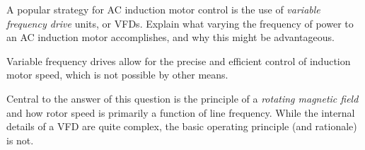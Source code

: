 

A popular strategy for AC induction motor control is the use of {\it variable frequency drive} units, or VFDs.  Explain what varying the frequency of power to an AC induction motor accomplishes, and why this might be advantageous.







Variable frequency drives allow for the precise and efficient control of induction motor speed, which is not possible by other means.







Central to the answer of this question is the principle of a {\it rotating magnetic field} and how rotor speed is primarily a function of line frequency.  While the internal details of a VFD are quite complex, the basic operating principle (and rationale) is not.




